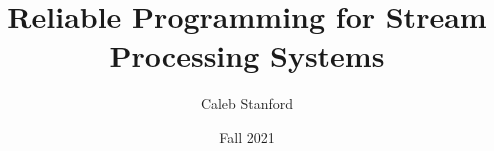\documentclass{article}
\title{\Large{} Reliable Programming for Stream Processing Systems}
\author{Caleb Stanford}
\date{Fall 2021}
\begin{document}
\maketitle{}



\tableofcontents{}

% 











\renewcommand{\refname}{Other References}


\end{document}
